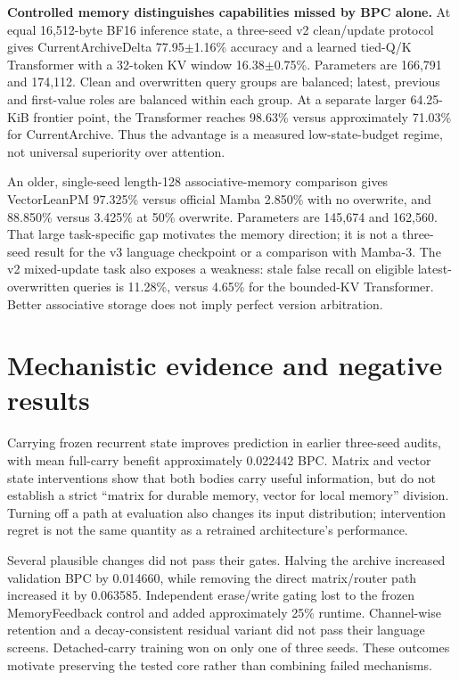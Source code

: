\documentclass[10pt]{article}
\begin{document}
\textbf{Controlled memory distinguishes capabilities missed by BPC alone.}
At equal 16,512-byte BF16 inference state, a three-seed v2 clean/update protocol
gives CurrentArchiveDelta 77.95$\pm$1.16\% accuracy and a learned tied-Q/K
Transformer with a 32-token KV window 16.38$\pm$0.75\%. Parameters are 166,791
and 174,112. Clean and overwritten query groups are balanced; latest, previous
and first-value roles are balanced within each group. At a separate larger
64.25-KiB frontier point, the Transformer reaches 98.63\% versus approximately
71.03\% for CurrentArchive. Thus the advantage is a measured low-state-budget
regime, not universal superiority over attention.

An older, single-seed length-128 associative-memory comparison gives
VectorLeanPM 97.325\% versus official Mamba 2.850\% with no overwrite, and
88.850\% versus 3.425\% at 50\% overwrite. Parameters are 145,674 and 162,560.
That large task-specific gap motivates the memory direction; it is not a
three-seed result for the v3 language checkpoint or a comparison with Mamba-3.
The v2 mixed-update task also exposes a weakness: stale false recall on
eligible latest-overwritten queries is 11.28\%, versus 4.65\% for the bounded-KV
Transformer. Better associative storage does not imply perfect version arbitration.

\section{Mechanistic evidence and negative results}
Carrying frozen recurrent state improves prediction in earlier three-seed
audits, with mean full-carry benefit approximately 0.022442 BPC. Matrix and vector
state interventions show that both bodies carry useful information, but do not
establish a strict ``matrix for durable memory, vector for local memory'' division.
Turning off a path at evaluation also changes its input distribution; intervention
regret is not the same quantity as a retrained architecture's performance.

Several plausible changes did not pass their gates. Halving the archive
increased validation BPC by 0.014660, while removing the direct matrix/router path
increased it by 0.063585. Independent erase/write gating lost to the frozen
MemoryFeedback control and added approximately 25\% runtime. Channel-wise
retention and a decay-consistent residual variant did not pass their language
screens. Detached-carry training won on only one of three seeds. These outcomes
motivate preserving the tested core rather than combining failed mechanisms.
\end{document}
